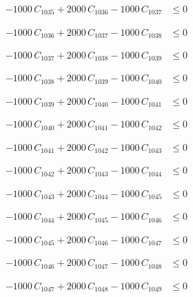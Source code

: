 \documentclass[a4paper,11pt]{article}
\begin{document}
\begin{align}
-1000\,C_{1035} + 2000\,C_{1036} - 1000\,C_{1037} &\leq 0 \nonumber
\end{align}

\begin{align}
-1000\,C_{1036} + 2000\,C_{1037} - 1000\,C_{1038} &\leq 0 \nonumber
\end{align}

\begin{align}
-1000\,C_{1037} + 2000\,C_{1038} - 1000\,C_{1039} &\leq 0 \nonumber
\end{align}

\begin{align}
-1000\,C_{1038} + 2000\,C_{1039} - 1000\,C_{1040} &\leq 0 \nonumber
\end{align}

\begin{align}
-1000\,C_{1039} + 2000\,C_{1040} - 1000\,C_{1041} &\leq 0 \nonumber
\end{align}

\begin{align}
-1000\,C_{1040} + 2000\,C_{1041} - 1000\,C_{1042} &\leq 0 \nonumber
\end{align}

\begin{align}
-1000\,C_{1041} + 2000\,C_{1042} - 1000\,C_{1043} &\leq 0 \nonumber
\end{align}

\begin{align}
-1000\,C_{1042} + 2000\,C_{1043} - 1000\,C_{1044} &\leq 0 \nonumber
\end{align}

\begin{align}
-1000\,C_{1043} + 2000\,C_{1044} - 1000\,C_{1045} &\leq 0 \nonumber
\end{align}

\begin{align}
-1000\,C_{1044} + 2000\,C_{1045} - 1000\,C_{1046} &\leq 0 \nonumber
\end{align}

\begin{align}
-1000\,C_{1045} + 2000\,C_{1046} - 1000\,C_{1047} &\leq 0 \nonumber
\end{align}

\begin{align}
-1000\,C_{1046} + 2000\,C_{1047} - 1000\,C_{1048} &\leq 0 \nonumber
\end{align}

\begin{align}
-1000\,C_{1047} + 2000\,C_{1048} - 1000\,C_{1049} &\leq 0 \nonumber
\end{align}
\end{document}
